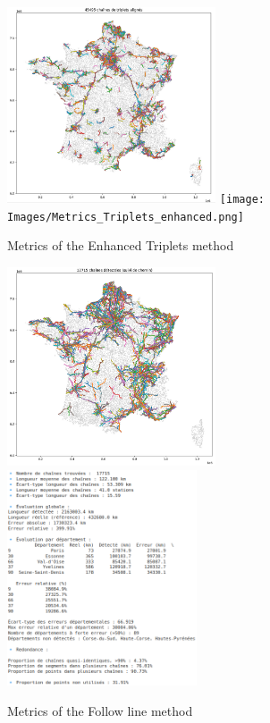 \documentclass[main.tex]{subfiles}
\begin{document}
\begin{figure}[H]
    \includegraphics[width=0.55\textwidth]{Images/Res_Triplets_enhanced.png}
    \texttt{[image: Images/Metrics\_Triplets\_enhanced.png]}
    \caption{Metrics of the Enhanced Triplets method}
\end{figure}

\begin{figure}[H]
    \includegraphics[width=0.55\textwidth]{Images/Res_Followline.png}
    \includegraphics[width=0.5\textwidth]{Images/Metrics_Followline.png}
    \caption{Metrics of the Follow line method}
\end{figure}
\end{document}
